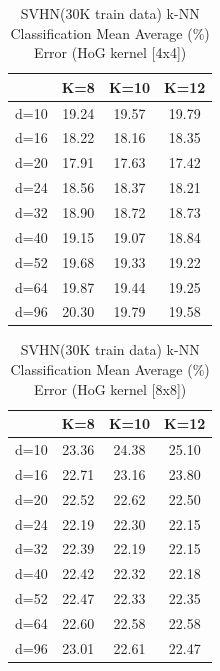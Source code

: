 \begin{table}[H]
\centering
\label{tab:table12}
\begin{tabular}{|c|c|c|c|}
\hline
 & K=8 & K=10 & K=12 \\
\hline
d=10 & 19.24 & 19.57 & 19.79 \\
d=16 & 18.22 & 18.16 & 18.35 \\
d=20 & 17.91 & 17.63 & 17.42 \\
d=24 & 18.56 & 18.37 & 18.21 \\
d=32 & 18.90 & 18.72 & 18.73 \\
d=40 & 19.15 & 19.07 & 18.84 \\
d=52 & 19.68 & 19.33 & 19.22 \\
d=64 & 19.87 & 19.44 & 19.25 \\
d=96 & 20.30 & 19.79 & 19.58 \\
\hline
\end{tabular}
\caption{SVHN(30K train data) k-NN Classification Mean Average (\%) Error (HoG kernel [4x4])}
\end{table}

\begin{table}[H]
\centering
\label{tab:table13}
\begin{tabular}{|c|c|c|c|}
\hline
 & K=8 & K=10 & K=12 \\
\hline
d=10 & 23.36 & 24.38 & 25.10 \\
d=16 & 22.71 & 23.16 & 23.80 \\
d=20 & 22.52 & 22.62 & 22.50 \\
d=24 & 22.19 & 22.30 & 22.15 \\
d=32 & 22.39 & 22.19 & 22.15 \\
d=40 & 22.42 & 22.32 & 22.18 \\
d=52 & 22.47 & 22.33 & 22.35 \\
d=64 & 22.60 & 22.58 & 22.58 \\
d=96 & 23.01 & 22.61 & 22.47 \\
\hline
\end{tabular}
\caption{SVHN(30K train data) k-NN Classification Mean Average (\%) Error (HoG kernel [8x8])}
\end{table}

